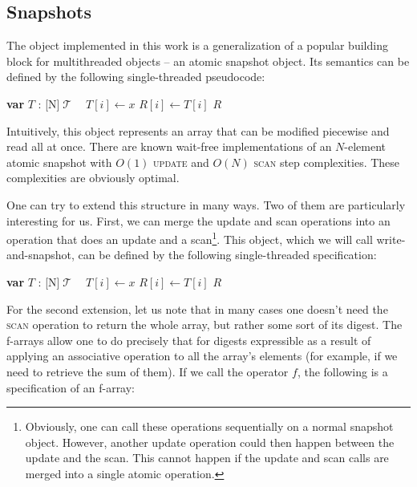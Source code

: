 \documentclass[a4paper,11pt]{article}
\def\T{\ensuremath{\operatorname{\mathcal{T}}}\text{ }}
\newcommand{\fn}[1]{\textsc{#1}}
\newcommand{\var}[2]{\textbf{var }#1 : #2}
\newcommand{\arrayspec}[1]{\text{array}[#1]\text{ of }}
\begin{document}
\subsection{Snapshots}

The object implemented in this work is a generalization of a popular building block for multithreaded objects
-- an atomic snapshot object\cite{snapshot-idea}. Its semantics can be defined by the following single-threaded pseudocode:

\begin{algorithmic}[1]
	\State\var{$T$}{\arrayspec{N}$\T$}
	\State $T[i] \gets x$
\EndFunction
{}
		\State $R[i] \gets T[i]$
	\EndFor
	\State\Return $R$
\EndFunction
\end{algorithmic}

Intuitively, this object represents an array that can be modified piecewise and read all at once.
There are known wait-free implementations of an $N$-element atomic snapshot with $O(1)$ \fn{update} and $O(N)$ \fn{scan} step complexities\cite{snapshot-impl}. These complexities are obviously
optimal.

One can try to extend this structure in many ways. Two of them are particularly interesting for us.
First, we can merge the update and scan operations
into an operation that does an update and a scan\footnote{Obviously, one can call these operations sequentially
on a normal snapshot object. However, another update operation could then happen between the update and the scan.
This cannot happen if the update and scan calls are merged into a single atomic operation.}.
This object, which we will call write-and-snapshot\cite{write-and-snap}, can be defined by the following single-threaded specification:

\begin{algorithmic}[1]
	\State\var{$T$}{\arrayspec{N}$\T$}
	\State $T[i] \gets x$
		\State $R[i] \gets T[i]$
	\EndFor
	\State\Return $R$
\EndFunction
\end{algorithmic}

For the second extension, let us note that in many cases one doesn't need the \fn{scan} operation to return the whole array, but rather some sort of its digest. The f-arrays\cite{f-array} allow one to do precisely that for digests expressible as
a result of applying an associative operation to all the array's elements (for example, if we need to retrieve the sum of them). If we call the operator $f$, the following is a specification of an f-array:
\end{document}
